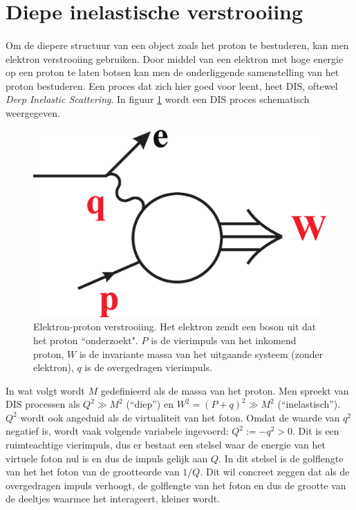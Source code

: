 \documentclass[a4paper,11pt]{article}
\numberwithin{equation}{section} %
\begin{document}
\thispagestyle{empty}
\newpage

\tableofcontents
\thispagestyle{empty}
\newpage

\section{Diepe inelastische verstrooiing}
      \paragraph{}
Om de diepere structuur van een object zoals het proton te bestuderen, kan men elektron verstrooiing gebruiken.
Door middel van een elektron met hoge energie op een proton te laten botsen kan men de onderliggende samenstelling van het proton bestuderen.
Een proces dat zich hier goed voor leent, heet DIS, oftewel \textit{Deep Inelastic Scattering}. In figuur \ref{fig:DIS} wordt een DIS proces schematisch weergegeven.
\begin{figure} [H]
  \begin{center}
    \includegraphics[width=.33\textwidth]{Afbeeldingen/DIS.eps}
    \caption{Elektron-proton verstrooiing.
Het elektron zendt een boson uit dat het proton “onderzoekt".
$P$ is de vierimpuls van het inkomend proton, $W$ is de invariante massa van het uitgaande systeem (zonder elektron), $q$ is de overgedragen vierimpuls. \cite{Martin}}
   \label{fig:DIS}
  \end{center}
\end{figure}
 In wat volgt wordt $M$ gedefinieerd als de massa van het proton. Men spreekt van DIS processen als $Q^2 \gg M^2$ (“diep”) en $W^2 = (P+q)^2 \gg M^2$ (“inelastisch”).
$Q^2$ wordt ook angeduid als de virtualiteit van het foton.
Omdat de waarde van $q^2$ negatief is, wordt vaak volgende variabele ingevoerd: $Q^2 :=-q^2 > 0$.  Dit is een ruimteachtige vierimpuls, dus er bestaat een stelsel waar de energie van het virtuele foton nul is en dus de impuls gelijk aan $Q$. In dit stelsel is de golflengte van het het foton van de grootteorde van $1/Q$.
Dit wil concreet zeggen dat als de overgedragen impuls verhoogt, de golflengte van het foton en dus de grootte van de deeltjes waarmee het interageert, kleiner wordt.
\end{document}

